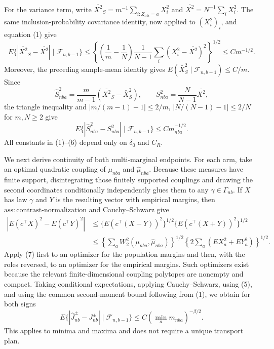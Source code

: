 For the variance term, write \(\overline{X^2}_S=m^{-1}\sum_{i:Z_{nbi}=a}X_i^2\) and \(\overline{X^2}=N^{-1}\sum_iX_i^2\). The same inclusion-probability covariance identity, now applied to \((X_i^2)_i\), and equation (1) give
\[
 E\{|\overline{X^2}_S-\overline{X^2}|\mid\mathcal F_{n,b-1}\}
 \le \left\{\left(\frac1m-\frac1N\right)
 \frac1{N-1}\sum_i(X_i^2-\overline{X^2})^2\right\}^{1/2}
 \le Cm^{-1/2}.
\]
Moreover, the preceding sample-mean identity gives \(E(\bar X_S^2\mid\mathcal F_{n,b-1})\le C/m\). Since
\[
 \widehat S_{nba}^2=\frac{m}{m-1}(\overline{X^2}_S-\bar X_S^2),
 \qquad S_{nba}^2=\frac{N}{N-1}\overline{X^2},
\]
the triangle inequality and \(|m/(m-1)-1|\le2/m\), \(|N/(N-1)-1|\le2/N\) for \(m,N\ge2\) give
\[
 E\{|\widehat S_{nba}^2-S_{nba}^2|\mid\mathcal F_{n,b-1}\}
 \le C m_{nba}^{-1/2}. \tag{6}
\]
All constants in (1)--(6) depend only on \(\delta_0\) and \(C_R\).

We next derive continuity of both multi-marginal endpoints. For each arm, take an optimal quadratic coupling of \(\mu_{nba}\) and \(\widehat\mu_{nba}\). Because these measures have finite support, disintegrating those finitely supported couplings and drawing the second coordinates conditionally independently glues them to any \(\gamma\in\Gamma_{nb}\). If \(X\) has law \(\gamma\) and \(Y\) is the resulting vector with empirical margins, then \(\mathrm{ass:contrast\text{-}normalization}\) and Cauchy--Schwarz give
\[
 \begin{aligned}
 |E(c^\top X)^2-E(c^\top Y)^2|
 &\le\{E(c^\top(X-Y))^2\}^{1/2}\{E(c^\top(X+Y))^2\}^{1/2}\\
 &\le\left\{\sum_aW_2^2(\mu_{nba},\widehat\mu_{nba})\right\}^{1/2}
       \left\{2\sum_a(E X_a^2+E Y_a^2)\right\}^{1/2}.
 \end{aligned}\tag{7}
\]
Apply (7) first to an optimizer for the population margins and then, with the roles reversed, to an optimizer for the empirical margins. Such optimizers exist because the relevant finite-dimensional coupling polytopes are nonempty and compact. Taking conditional expectations, applying Cauchy--Schwarz, using (5), and using the common second-moment bound following from (1), we obtain for both signs
\[
 E\{|\widehat J_{nb}^{\pm}-J_{nb}^{\pm}|\mid\mathcal F_{n,b-1}\}
 \le C\left(\min_a m_{nba}\right)^{-\beta/2}. \tag{8}
\]
This applies to minima and maxima and does not require a unique transport plan.

